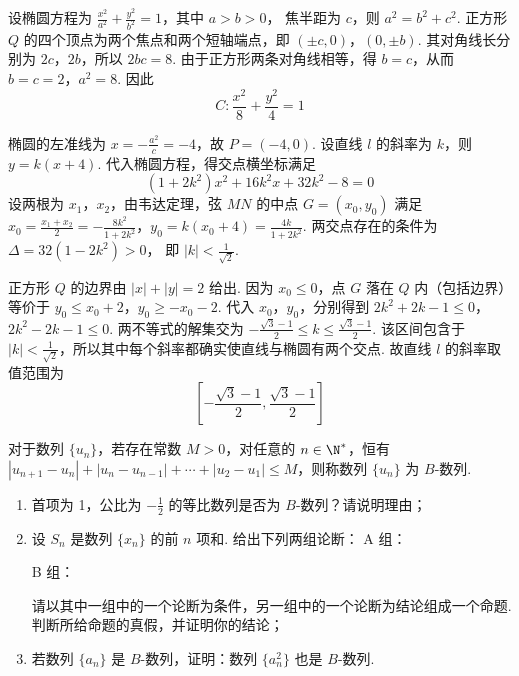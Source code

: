 \begin{solution}
设椭圆方程为 \(\frac{x^2}{a^2}+\frac{y^2}{b^2}=1\)，其中 \(a>b>0\)，
焦半距为 \(c\)，则 \(a^2=b^2+c^2\). 正方形 \(Q\) 的四个顶点为两个焦点和两个短轴端点，即 \((\pm c,0)\)，\((0,\pm b)\). 其对角线长分别为 \(2c\)，\(2b\)，所以 \(2bc=8\).
由于正方形两条对角线相等，得 \(b=c\)，从而 \(b=c=2\)，\(a^2=8\). 因此
\[
 C:\frac{x^2}{8}+\frac{y^2}{4}=1
\]

椭圆的左准线为 \(x=-\frac{a^2}{c}=-4\)，故 \(P=(-4,0)\). 设直线 \(l\) 的斜率为 \(k\)，则 \(y=k(x+4)\).
代入椭圆方程，得交点横坐标满足
\[
(1+2k^2)x^2+16k^2x+32k^2-8=0
\]
设两根为 \(x_1\)，\(x_2\)，由韦达定理，弦 \(MN\) 的中点 \(G=(x_0,y_0)\) 满足 \(x_0=\frac{x_1+x_2}{2}=-\frac{8k^2}{1+2k^2}\)，\(y_0=k(x_0+4)=\frac{4k}{1+2k^2}\).
两交点存在的条件为 \(\Delta=32(1-2k^2)>0\)，
即 \(|k|<\frac1{\sqrt2}\).

正方形 \(Q\) 的边界由 \(|x|+|y|=2\) 给出. 因为 \(x_0\leq0\)，点 \(G\) 落在 \(Q\) 内（包括边界）等价于 \(y_0\leq x_0+2\)，\(y_0\geq-x_0-2\). 代入 \(x_0\)，\(y_0\)，分别得到 \(2k^2+2k-1\leq0\)，\(2k^2-2k-1\leq0\).
两不等式的解集交为 \(-\frac{\sqrt3-1}{2}\leq k\leq\frac{\sqrt3-1}{2}\).
该区间包含于 \(|k|<\frac1{\sqrt2}\)，所以其中每个斜率都确实使直线与椭圆有两个交点. 故直线 \(l\) 的斜率取值范围为
\[
\left[-\frac{\sqrt3-1}{2},\frac{\sqrt3-1}{2}\right]
\]
\end{solution}

\begin{problem}
对于数列 \(\{u_n\}\)，若存在常数 \(M > 0\)，对任意的 \(n \in \N^*\)，恒有 \(|u_{n+1} - u_n| + |u_n - u_{n-1}| + \cdots + |u_2 - u_1| \leqslant M\)，则称数列 \(\{u_n\}\) 为 \(B\)-数列.
\begin{enumerate}
\item 首项为 1，公比为 \( -\frac{1}{2} \) 的等比数列是否为 \(B\)-数列？请说明理由；
\item 设 \(S_{n}\) 是数列 \(\{x_{n}\}\) 的前 \(n\) 项和. 给出下列两组论断：
A 组：
B 组：
{\renewcommand{\circled}[2][]{\tikz[baseline=(char.base)]{\node[shape=circle,draw,inner sep=0.8pt](char){\small \number\numexpr#2+2\relax};}}
}
请以其中一组中的一个论断为条件，另一组中的一个论断为结论组成一个命题. 判断所给命题的真假，并证明你的结论；
\item 若数列 \(\{a_n\}\) 是 \(B\)-数列，证明：数列 \(\{a_{n}^{2}\}\) 也是 \(B\)-数列.
\end{enumerate}
\end{problem}

